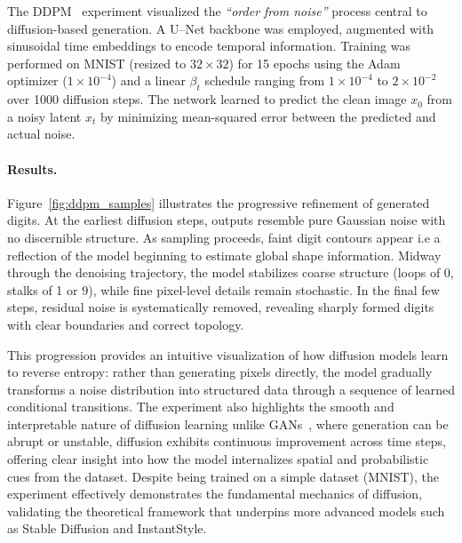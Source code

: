 \noindent
The DDPM~\cite{ho2020ddpm} experiment visualized the \emph{“order from noise”} process central to diffusion-based generation.  
A U–Net backbone was employed, augmented with sinusoidal time embeddings to encode temporal information.  
Training was performed on MNIST (resized to \(32\times32\)) for 15 epochs using the Adam optimizer (\(1\times10^{-4}\)) and a linear \(\beta_t\) schedule ranging from \(1\times10^{-4}\) to \(2\times10^{-2}\) over 1000 diffusion steps.  
The network learned to predict the clean image \(x_0\) from a noisy latent \(x_t\) by minimizing mean-squared error between the predicted and actual noise.

\paragraph{Results.}
Figure~\ref{fig:ddpm_samples} illustrates the progressive refinement of generated digits.  
At the earliest diffusion steps, outputs resemble pure Gaussian noise with no discernible structure.  
As sampling proceeds, faint digit contours appear i.e a reflection of the model beginning to estimate global shape information.  
Midway through the denoising trajectory, the model stabilizes coarse structure (loops of 0, stalks of 1 or 9), while fine pixel-level details remain stochastic.  
In the final few steps, residual noise is systematically removed, revealing sharply formed digits with clear boundaries and correct topology.  

This progression provides an intuitive visualization of how diffusion models learn to reverse entropy: rather than generating pixels directly, the model gradually transforms a noise distribution into structured data through a sequence of learned conditional transitions.  
The experiment also highlights the smooth and interpretable nature of diffusion learning  unlike GANs~\cite{goodfellow2014gan}, where generation can be abrupt or unstable, diffusion exhibits continuous improvement across time steps, offering clear insight into how the model internalizes spatial and probabilistic cues from the dataset.  
Despite being trained on a simple dataset (MNIST), the experiment effectively demonstrates the fundamental mechanics of diffusion, validating the theoretical framework that underpins more advanced models such as Stable Diffusion and InstantStyle.

